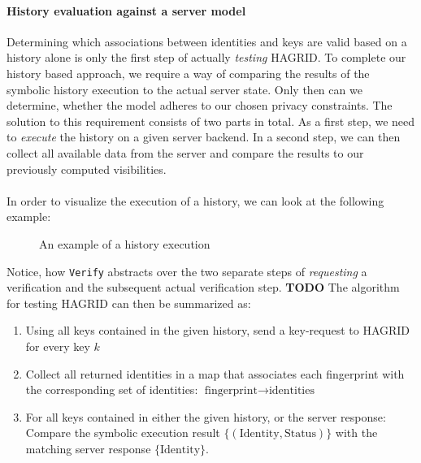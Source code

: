 \paragraph{History evaluation against a server model}
Determining which associations between identities and keys are valid based on a history alone is only the first step of actually \emph{testing} HAGRID. To complete our history based approach, we require a way of comparing the results of the symbolic history execution to the actual server state. Only then can we determine, whether the model adheres to our chosen privacy constraints.
The solution to this requirement consists of two parts in total. As a first step, we need to \emph{execute} the history on a given server backend. In a second step, we can then collect all available data from the server and compare the results to our previously computed visibilities. 
\\ \\
In order to visualize the execution of a history, we can look at the following example: 
\begin{figure}[H]
    \label{fig:history}
    \centering
    \caption{An example of a history execution}
\end{figure}


Notice, how \texttt{Verify} abstracts over the two separate steps of \emph{requesting} a verification and the subsequent actual verification step.
\textbf{TODO}
The algorithm for testing HAGRID can then be summarized as: 
\begin{enumerate}
    \item Using all keys contained in the given history, send a key-request to HAGRID for every key $k$
    \item Collect all returned identities in a map that associates each fingerprint with the corresponding set of identities: $ \text{fingerprint} \rightarrow \text{identities}$
    \item\label{sec:comp_hagrid} For all keys contained in either the given history, or the server response: Compare the symbolic execution result $\{(\text{Identity},\text{Status})\}$ with the matching server response $\{\text{Identity}\}$.
\end{enumerate}

